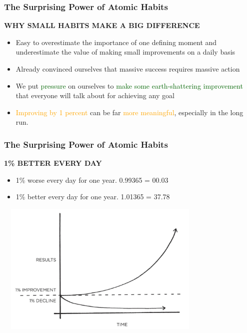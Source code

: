 \documentclass{beamer}
\begin{document}
\begin{frame}
    \frametitle{The Surprising Power of Atomic Habits}
    \textbf{WHY SMALL HABITS MAKE A BIG DIFFERENCE}
    \begin{itemize}
        \item Easy to overestimate the importance of one defining moment and underestimate the value of making small improvements on a daily basis
        \item Already convinced ourselves that massive success requires massive action
        \item We put \textcolor{darkgreen}{pressure} on ourselves to \textcolor{darkgreen}{make some earth-shattering improvement} that everyone will talk about for achieving any goal
        \item  \textcolor{orange}{Improving by 1 percent} can be far \textcolor{orange}{more meaningful}, especially in the long run.
    \end{itemize}
\end{frame}


\begin{frame}
    \frametitle{The Surprising Power of Atomic Habits}
    \textbf{1\% BETTER EVERY DAY}
    \begin{itemize}
        \item 1\% worse every day for one year. 0.99365 = 00.03
        \item 1\% better every day for one year. 1.01365 = 37.78
    \end{itemize}
    \includegraphics[width=4.0in, height=2.5in]{img1.png}\\
\end{frame}
\end{document}
